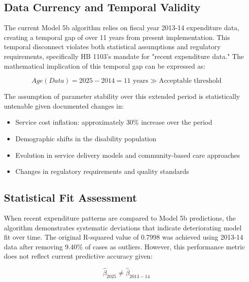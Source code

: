 \subsection{Data Currency and Temporal Validity}

The current Model 5b algorithm relies on fiscal year 2013-14 expenditure data, creating a temporal gap of over 11 years from present implementation. This temporal disconnect violates both statistical assumptions and regulatory requirements, specifically HB 1103's mandate for "recent expenditure data." The mathematical implication of this temporal gap can be expressed as:

\begin{equation}
Age(Data) = 2025 - 2014 = 11 \text{ years} \gg \text{Acceptable threshold}
\end{equation}

The assumption of parameter stability over this extended period is statistically untenable given documented changes in:
\begin{itemize}
    \item Service cost inflation: approximately 30\% increase over the period
    \item Demographic shifts in the disability population
    \item Evolution in service delivery models and community-based care approaches
    \item Changes in regulatory requirements and quality standards
\end{itemize}

\subsection{Statistical Fit Assessment}

When recent expenditure patterns are compared to Model 5b predictions, the algorithm demonstrates systematic deviations that indicate deteriorating model fit over time. The original R-squared value of 0.7998 was achieved using 2013-14 data after removing 9.40\% of cases as outliers. However, this performance metric does not reflect current predictive accuracy given:

\begin{equation}
\hat{\beta}_{2025} \neq \hat{\beta}_{2013-14}
\end{equation}

